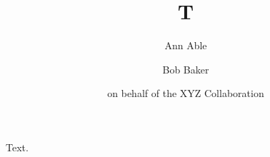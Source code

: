 \documentclass{article}
\newcommand\obo{on behalf of}
\begin{document}
\title{T}
\author{Ann Able \and Bob Baker \and \obo{} the XYZ Collaboration}
\maketitle
Text.
\end{document}

